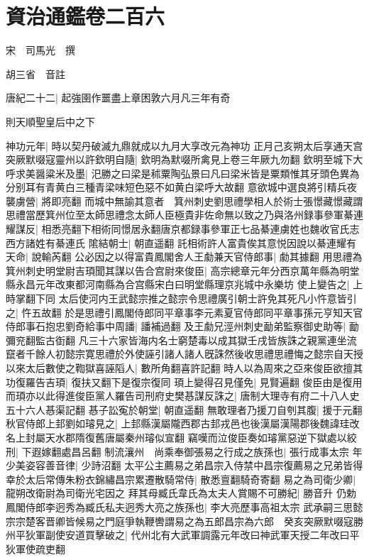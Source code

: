 \section{資治通鑑卷二百六}
宋　司馬光　撰

胡三省　音註

唐紀二十二|{
	起強圉作噩盡上章困敦六月凡三年有奇}


則天順聖皇后中之下

神功元年|{
	時以契丹破滅九鼎就成以九月大享改元為神功}
正月己亥朔太后享通天宫　突厥默啜寇靈州以許欽明自隨|{
	欽明為默啜所禽見上卷三年厥九勿翻}
欽明至城下大呼求美醤粱米及墨|{
	汜勝之曰梁是秫粟陶弘景曰凡曰梁米皆是粟類惟其牙頭色異為分别耳有青黄白三種青梁味短色惡不如黄白梁呼大故翻}
意欲城中選良將引精兵夜襲虜營|{
	將即亮翻}
而城中無諭其意者　箕州刺史劉思禮學相人於術士張憬藏憬藏謂思禮當歷箕州位至太師思禮念太師人臣極貴非佐命無以致之乃與洛州録事參軍綦連耀謀反|{
	相悉亮翻下相術同憬居永翻唐京都録事參軍正七品綦連虜姓也魏收官氏志西方諸姓有綦連氏}
隂結朝士|{
	朝直遥翻}
託相術許人富貴俟其意悦因說以綦連耀有天命|{
	說輸芮翻}
公必因之以得富貴鳳閣舍人王勮兼天官侍郎事|{
	勮其據翻}
用思禮為箕州刺史明堂尉吉頊聞其謀以告合宫尉來俊臣|{
	高宗總章元年分西京萬年縣為明堂縣永昌元年改東都河南縣為合宫縣宋白曰明堂縣理京兆城中永樂坊}
使上變告之|{
	上時掌翻下同}
太后使河内王武懿宗推之懿宗令思禮廣引朝士許免其死凡小忤意皆引之|{
	忤五故翻}
於是思禮引鳳閣侍郎同平章事李元素夏官侍郎同平章事孫元亨知天官侍郎事石抱忠劉奇給事中周譒|{
	譒補過翻}
及王勮兄涇州刺史勔弟監察御史助等|{
	勔彌兖翻監古衘翻}
凡三十六家皆海内名士窮楚毒以成其獄壬戌皆族誅之親黨連坐流竄者千餘人初懿宗寛思禮於外使誣引諸人諸人旣誅然後收思禮思禮悔之懿宗自天授以來太后數使之鞫獄喜誣䧟人|{
	數所角翻喜許記翻}
時人以為周來之亞來俊臣欲擅其功復羅告吉頊|{
	復扶又翻下是復宗復同}
頊上變得召見僅免|{
	見賢遍翻}
俊臣由是復用而頊亦以此得進俊臣黨人羅告司刑府史樊惎謀反誅之|{
	唐制大理寺有府二十八人史五十六人惎渠記翻}
惎子訟寃於朝堂|{
	朝直遥翻}
無敢理者乃援刀自刳其腹|{
	援于元翻}
秋官侍郎上邽劉如璿見之|{
	上邽縣漢屬隴西郡古邽戎邑也後漢屬漢陽郡後魏諱珪改名上封屬天水郡隋復舊唐屬秦州璿似宣翻}
竊嘆而泣俊臣奏如璿黨惡逆下獄處以絞刑|{
	下遐嫁翻處昌呂翻}
制流瀼州　尚乘奉御張易之行成之族孫也|{
	張行成事太宗}
年少美姿容善音律|{
	少詩沼翻}
太平公主薦易之弟昌宗入侍禁中昌宗復薦易之兄弟皆得幸於太后常傳朱粉衣錦繡昌宗累遷散騎常侍|{
	散悉亶翻騎奇寄翻}
易之為司衛少卿|{
	龍朔改衛尉為司衛光宅因之}
拜其母臧氏韋氏為太夫人賞賜不可勝紀|{
	勝音升}
仍勅鳳閣侍郎李迥秀為臧氏私夫迥秀大亮之族孫也|{
	李大亮歷事高祖太宗}
武承嗣三思懿宗宗楚客晋卿皆候易之門庭爭執鞭轡謂易之為五郎昌宗為六郎　癸亥突厥默啜寇勝州平狄軍副使安道買擊破之|{
	代州北有大武軍調露元年改曰神武軍天授二年改曰平狄軍使疏吏翻}
